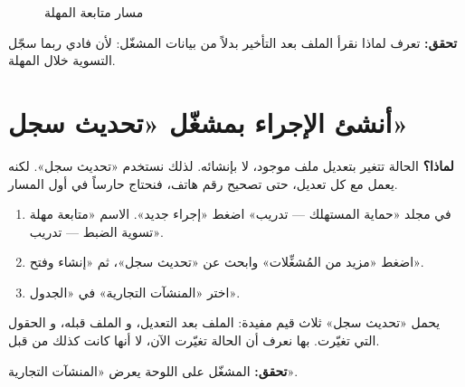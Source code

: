 \begin{figure}[H]
\centering
{}
\rclegend
\caption{مسار متابعة المهلة}
\label{fig:real-design}
\end{figure}
\textbf{تحقق:} تعرف لماذا نقرأ الملف بعد التأخير بدلاً من بيانات المشغّل: لأن فادي ربما سجّل التسوية خلال المهلة.

\section{أنشئ الإجراء بمشغّل «تحديث سجل»}
\label{sec:real-trigger}
\textbf{لماذا؟} الحالة تتغير بتعديل ملف موجود، لا بإنشائه. لذلك نستخدم «تحديث سجل». لكنه يعمل مع كل تعديل، حتى تصحيح رقم هاتف، فنحتاج حارساً في أول المسار.
\begin{enumerate}
\item في مجلد «حماية المستهلك — تدريب» اضغط «إجراء جديد». الاسم «متابعة مهلة تسوية الضبط — تدريب».
\item اضغط «مزيد من المُشغِّلات» وابحث عن «تحديث سجل»، ثم «إنشاء وفتح».
\item اختر «المنشآت التجارية» في «الجدول».
\end{enumerate}
\begin{rcnote}
يحمل «تحديث سجل» ثلاث قيم مفيدة:  الملف بعد التعديل، و الملف قبله، و الحقول التي تغيّرت. بها نعرف أن الحالة تغيّرت الآن، لا أنها كانت كذلك من قبل.
\end{rcnote}
\textbf{تحقق:} المشغّل على اللوحة يعرض «المنشآت التجارية».

